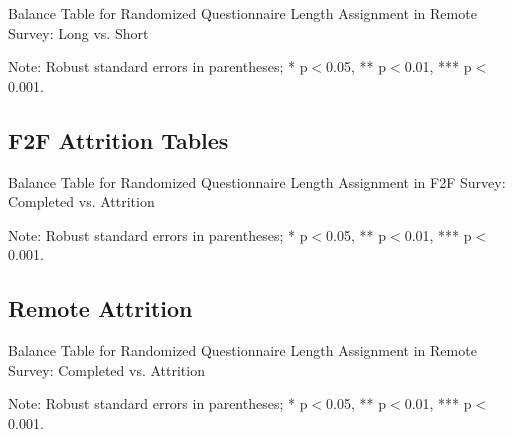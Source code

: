 \documentclass[11pt,harvard]{article}
\begin{document}
\begin{table}[htbp]
	\centering
	\begin{adjustbox}{max width=\textwidth}
		\begin{threeparttable}
			\caption{Balance Table for Randomized Questionnaire Length Assignment in Remote Survey: Long vs. Short}
			\scriptsize
			 
			\label{tab:CAR_Listing_Demo_Balance_RM_Length}
			\begin{tablenotes}
				\item Note: Robust standard errors in parentheses; * p$<$0.05, ** p$<$0.01, *** p$<$0.001.
			\end{tablenotes}
		\end{threeparttable}
	\end{adjustbox}
\end{table}

\pagebreak

\subsection{F2F Attrition Tables}

\begin{table}[htbp]
	\centering
	\begin{adjustbox}{max width=\textwidth}
		\begin{threeparttable}
			\caption{Balance Table for Randomized Questionnaire Length Assignment in F2F Survey: Completed vs. Attrition}
			\scriptsize
			 
			\label{tab:CAR_Listing_Demo_Attrition_F2F}
			\begin{tablenotes}
				\item Note: Robust standard errors in parentheses; * p$<$0.05, ** p$<$0.01, *** p$<$0.001.
			\end{tablenotes}
		\end{threeparttable}
	\end{adjustbox}
\end{table}

\pagebreak

\subsection{Remote Attrition}

\begin{table}[htbp]
	\centering
	\begin{adjustbox}{max width=\textwidth}
		\begin{threeparttable}
			\caption{Balance Table for Randomized Questionnaire Length Assignment in Remote Survey: Completed vs. Attrition}
			\scriptsize
			 
			\label{tab:CAR_Listing_Demo_Attrition_Remote}
			\begin{tablenotes}
				\item Note: Robust standard errors in parentheses; * p$<$0.05, ** p$<$0.01, *** p$<$0.001.
			\end{tablenotes}
		\end{threeparttable}
	\end{adjustbox}
\end{table}
\end{document}
